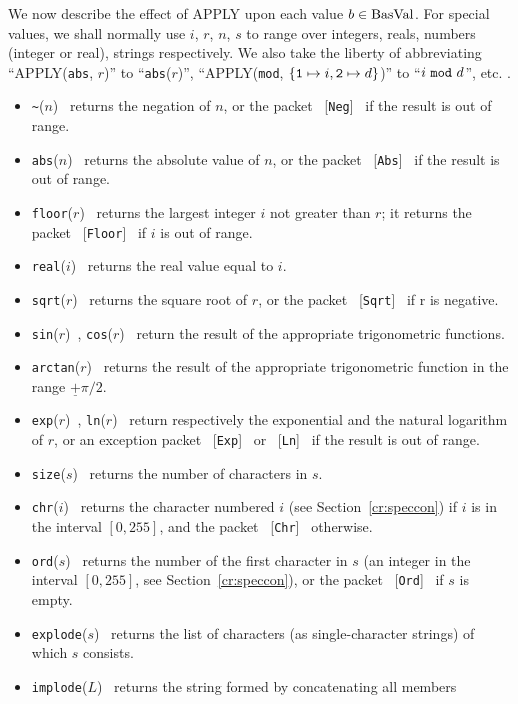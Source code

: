 We now describe the effect of APPLY upon each value
$b\in{\rm BasVal}$.  For special values, we shall normally use $i$, $r$,
$n$, $s$ to range over integers, reals, numbers (integer or real),
strings respectively.  We also take the liberty of abbreviating
``APPLY(\mbox{{\tt abs}}, $r$)'' to ``\mbox{{\tt abs}}($r$)'',
``APPLY({\tt mod}, $\{\verb+1+\mapsto i,\verb+2+\mapsto d\}$)'' to
``$i\ {\tt mod}\ d$'', etc. .
\begin{itemize}
\item \verb+~+($n$)~ returns the negation of $n$, or the 
      packet ~[{\tt Neg}]~ if the result is out of range.
\item \mbox{{\tt abs}}($n$)~ returns the absolute value of $n$, or
      the packet ~[{\tt Abs}]~ if the result is out of range.
\item {\tt floor}($r$)~ returns the largest integer $i$ not greater than $r$;
      it returns the packet ~[{\tt Floor}]~ if $i$ is out of range.
\item {\tt real}($i$)~ returns the real value equal to $i$.
\item {\tt sqrt}($r$)~ returns the square root of $r$, or the packet
      ~[{\tt Sqrt}]~ if r is negative.
\item {\tt sin}($r$)~,  {\tt cos}($r$)~ return the result of the appropriate
      trigonometric functions.
\item {\tt arctan}($r$)~ returns the result of the appropriate
      trigonometric function in the range $\underline{+}\pi/2$.
\item {\tt exp}($r$)~, {\tt ln}($r$)~ return respectively the exponential
      and the natural logarithm of $r$, or an exception packet
      ~[{\tt Exp}]~ or ~[{\tt Ln}]~ if the result is out of range.
\item {\tt size}($s$)~ returns the number of characters in $s$.
\item {\tt chr}($i$)~ returns the character numbered $i$ (see Section~\ref{cr:speccon}) if $i$ is in the interval $[0,255]$, and the packet
      ~[{\tt Chr}]~ otherwise.
\item {\tt ord}($s$)~ returns the number of the first character
      in $s$ (an integer in the interval $[0,255]$, see Section~\ref{cr:speccon}), 
      or the packet ~[{\tt Ord}]~ if $s$ is empty.
\item {\tt explode}($s$)~ returns the list of characters (as single-character
      strings) of which $s$ consists.
\item {\tt implode}($L$)~ returns the string formed by concatenating all members

\end{itemize}
